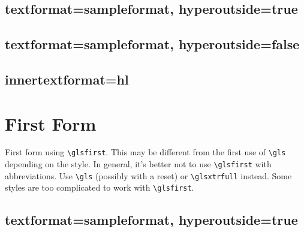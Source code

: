 \documentclass{report}
\begin{document}

\section{textformat=sampleformat, hyperoutside=true}


\section{textformat=sampleformat, hyperoutside=false}


\section{innertextformat=hl}

\glsxtrinsertinsidefalse

\chapter{First Form}
First form using \verb|\glsfirst|. This may be different
from the first use of \verb|\gls| depending on the style.
In general, it's better not to use \verb|\glsfirst| with
abbreviations. Use \verb|\gls| (possibly with a reset) 
or \verb|\glsxtrfull| instead.
Some styles are too complicated to work with \verb|\glsfirst|.


\section{textformat=sampleformat, hyperoutside=true}
\end{document}

